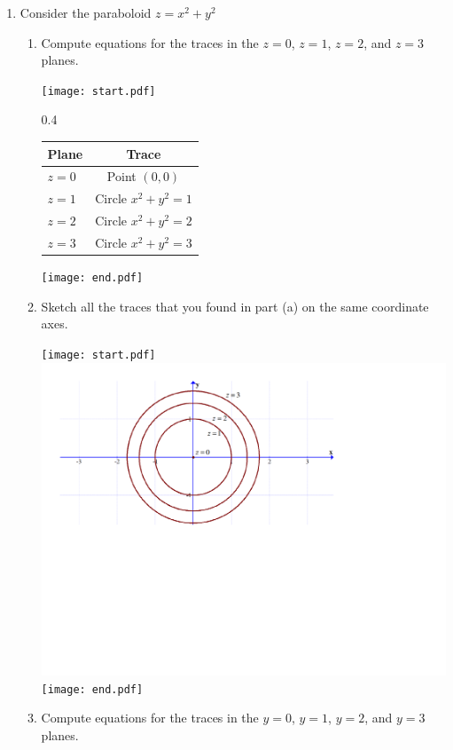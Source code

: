 \documentclass[12pt]{article}
\begin{document}
\begin{enumerate}
\begin{enumerate}
\end{enumerate}

\item Consider the paraboloid $z=x^2+y^2$

\begin{enumerate}

\item Compute equations for the traces in the $z=0$, $z=1$, $z=2$, and $z=3$ planes.

\texttt{[image: start.pdf]}
{{{0.4\linewidth}{\begin{center}
\begin{tabular}{l|c}
{\bf Plane} & {\bf Trace}\\
\hline
$z=0$ & Point $(0,0)$\\
$z=1$ & Circle $x^2+y^2=1$\\
$z=2$ & Circle $x^2+y^2=2$\\
$z=3$ & Circle $x^2+y^2=3$\\
\end{tabular}
\end{center}
}}}
\texttt{[image: end.pdf]}


\item Sketch all the traces that you found in part (a) on the same coordinate axes.

\texttt{[image: start.pdf]}
{{\includegraphics[scale=0.33]{traces.pdf}}}
\texttt{[image: end.pdf]}


\item Compute equations for the traces in the $y=0$, $y=1$, $y=2$, and $y=3$ planes.


\end{enumerate}
\end{enumerate}
\end{document}
